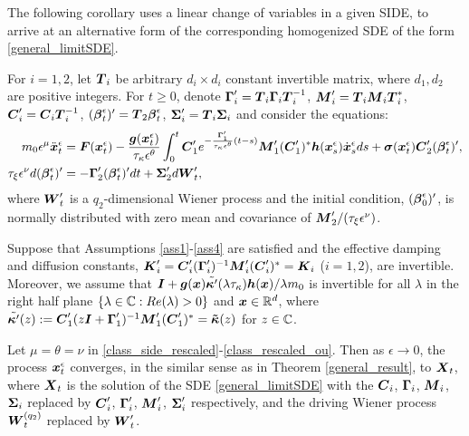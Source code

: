 The following corollary uses a linear change of variables in a given SIDE, to arrive at an alternative form of the corresponding homogenized SDE of the form \eqref{general_limitSDE}.  

\begin{corollary} \label{class_thm}
For $i=1,2$, let $\boldsymbol{T}_i$ be arbitrary $d_i \times d_i$ constant invertible matrix, where $d_1,d_2$ are positive integers. For $t \ge 0$, denote   $\boldsymbol{\Gamma}'_i=\boldsymbol{T}_i \boldsymbol{\Gamma}_i \boldsymbol{T}^{-1}_i$, $\boldsymbol{M}_i' = \boldsymbol{T}_i \boldsymbol{M}_i \boldsymbol{T}_i^{*}$, $\boldsymbol{C}'_i =\boldsymbol{C}_i \boldsymbol{T}_i^{-1}$, $(\boldsymbol{\beta}^\epsilon_t)'=\boldsymbol{T}_2 \boldsymbol{\beta}^\epsilon_t$, $\boldsymbol{\Sigma}_i' = \boldsymbol{T}_i \boldsymbol{\Sigma}_i$ and consider the  equations:
\begin{align} 
m_0 \epsilon^{\mu} \ddot{\boldsymbol{x}}^\epsilon_{t} &=  \boldsymbol{F}(\boldsymbol{x}^\epsilon_{t}) - \frac{\boldsymbol{g}(\boldsymbol{x}^\epsilon_{t})}{\tau_{\kappa} \epsilon^{\theta}} \int_{0}^{t} \boldsymbol{C}'_1e^{-\frac{\boldsymbol{\Gamma}'_1}{\tau_{\kappa}\epsilon^{\theta}}(t-s)} \boldsymbol{M}'_1 (\boldsymbol{C}'_1)^* \boldsymbol{h}(\boldsymbol{x}^\epsilon_{s}) \dot{\boldsymbol{x}}^\epsilon_{s} ds +  \boldsymbol{\sigma}(\boldsymbol{x}^\epsilon_{t}) \boldsymbol{C}'_2 (\boldsymbol{\beta}^\epsilon_{t})',  \label{class_side_rescaled} \\
\tau_{\xi}\epsilon^\nu d(\boldsymbol{\beta}^\epsilon_t)' &= -\boldsymbol{\Gamma}'_2  (\boldsymbol{\beta}^\epsilon_t)' dt + \boldsymbol{\Sigma}'_2 d\boldsymbol{W}'_t, \label{class_rescaled_ou}
\end{align}
where $\boldsymbol{W}'_t$ is a $q_2$-dimensional Wiener process and the initial condition, $(\boldsymbol{\beta}^\epsilon_0)'$, is normally distributed with zero mean and covariance of $\boldsymbol{M}'_2/(\tau_{\xi} \epsilon^\nu)$. 

Suppose that Assumptions \ref{ass1}-\ref{ass4} are satisfied and the effective damping and diffusion constants, $\boldsymbol{K}'_i = \boldsymbol{C}'_i (\boldsymbol{\Gamma}_i')^{-1} \boldsymbol{M}_i' (\boldsymbol{C}_i')^{*} = \boldsymbol{K}_i$ ($i=1,2$), are invertible. Moreover, we assume that  $\boldsymbol{I} + \boldsymbol{g}(\boldsymbol{x}) \tilde{\boldsymbol{\kappa}'}(\lambda \tau_{\kappa}) \boldsymbol{h}(\boldsymbol{x})/\lambda m_0$ is invertible for all $\lambda$ in the right half plane $\{\lambda \in \mathbb{C}: Re(\lambda)>0\}$ and $\boldsymbol{x} \in \mathbb{R}^d$, where $\tilde{\boldsymbol{\kappa}'}(z) := \boldsymbol{C}'_1(z\boldsymbol{I} + \boldsymbol{\Gamma}'_1)^{-1}\boldsymbol{M}'_1 (\boldsymbol{C}'_1)^* = \boldsymbol{\tilde{\kappa}}(z)$ for $z \in \mathbb{C}$. 

Let $\mu = \theta = \nu$ in \eqref{class_side_rescaled}-\eqref{class_rescaled_ou}. Then as $\epsilon \to 0$, the process $\boldsymbol{x}^\epsilon_t$ converges, in the similar sense as in Theorem \ref{general_result}, to $\boldsymbol{X}_t$, where $\boldsymbol{X}_{t}$ is the solution of the SDE \eqref{general_limitSDE} with the $\boldsymbol{C}_i$, $\boldsymbol{\Gamma}_i$, $\boldsymbol{M}_i$, $\boldsymbol{\Sigma}_i$ replaced by $\boldsymbol{C}'_i$, $\boldsymbol{\Gamma}'_i$, $\boldsymbol{M}'_i$, $\boldsymbol{\Sigma}'_i$ respectively, and the driving Wiener process $\boldsymbol{W}^{(q_2)}_t$ replaced by $\boldsymbol{W}_t'$.
\end{corollary}

